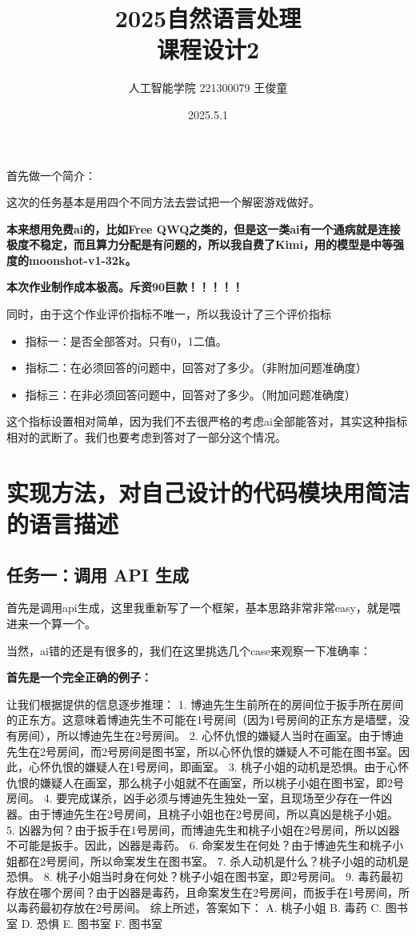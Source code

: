 \documentclass[answers]{exam}  %
\title{2025自然语言处理 \\ 课程设计2}
\date{2025.5.1}
\author{人工智能学院 221300079 王俊童}
\begin{document}
\maketitle

首先做一个简介：

这次的任务基本是用四个不同方法去尝试把一个解密游戏做好。

\textbf{本来想用免费ai的，比如Free QWQ之类的，但是这一类ai有一个通病就是连接极度不稳定，而且算力分配是有问题的，所以我自费了Kimi，用的模型是中等强度的moonshot-v1-32k。}

\textbf{本次作业制作成本极高。斥资90巨款！！！！！}

同时，由于这个作业评价指标不唯一，所以我设计了三个评价指标
\begin{itemize}
    \item 指标一：是否全部答对。只有0，1二值。
    \item 指标二：在必须回答的问题中，回答对了多少。（非附加问题准确度）
    \item 指标三：在非必须回答问题中，回答对了多少。（附加问题准确度）
\end{itemize}
这个指标设置相对简单，因为我们不去很严格的考虑ai全部能答对，其实这种指标相对的武断了。我们也要考虑到答对了一部分这个情况。

\section{实现方法，对自己设计的代码模块用简洁的语言描述}
\subsection{任务一：调用 API 生成}

首先是调用api生成，这里我重新写了一个框架，基本思路非常非常easy，就是喂进来一个算一个。

当然，ai错的还是有很多的，我们在这里挑选几个case来观察一下准确率：

\textbf{首先是一个完全正确的例子：}

让我们根据提供的信息逐步推理： 1. 博迪先生生前所在的房间位于扳手所在房间的正东方。这意味着博迪先生不可能在1号房间（因为1号房间的正东方是墙壁，没有房间），所以博迪先生在2号房间。 2. 心怀仇恨的嫌疑人当时在画室。由于博迪先生在2号房间，而2号房间是图书室，所以心怀仇恨的嫌疑人不可能在图书室。因此，心怀仇恨的嫌疑人在1号房间，即画室。 3. 桃子小姐的动机是恐惧。由于心怀仇恨的嫌疑人在画室，那么桃子小姐就不在画室，所以桃子小姐在图书室，即2号房间。 4. 要完成谋杀，凶手必须与博迪先生独处一室，且现场至少存在一件凶器。由于博迪先生在2号房间，且桃子小姐也在2号房间，所以真凶是桃子小姐。 5. 凶器为何？由于扳手在1号房间，而博迪先生和桃子小姐在2号房间，所以凶器不可能是扳手。因此，凶器是毒药。 6. 命案发生在何处？由于博迪先生和桃子小姐都在2号房间，所以命案发生在图书室。 7. 杀人动机是什么？桃子小姐的动机是恐惧。 8. 桃子小姐当时身在何处？桃子小姐在图书室，即2号房间。 9. 毒药最初存放在哪个房间？由于凶器是毒药，且命案发生在2号房间，而扳手在1号房间，所以毒药最初存放在2号房间。 综上所述，答案如下： A. 桃子小姐 B. 毒药 C. 图书室 D. 恐惧 E. 图书室 F. 图书室
\end{document}
